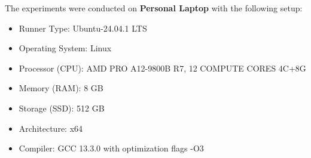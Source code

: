 The experiments were conducted on \textbf{Personal Laptop} with the following setup:
\begin{itemize}
    \item Runner Type: Ubuntu-24.04.1 LTS
    \item Operating System: Linux
    \item Processor (CPU): AMD PRO A12-9800B R7, 12 COMPUTE CORES 4C+8G
    \item Memory (RAM): 8 GB
    \item Storage (SSD): 512 GB
    \item Architecture: x64
    \item Compiler: GCC 13.3.0 with optimization flags -O3
\end{itemize}